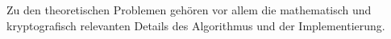 Zu den theoretischen Problemen gehören vor allem die mathematisch und kryptografisch relevanten Details des Algorithmus und der Implementierung.